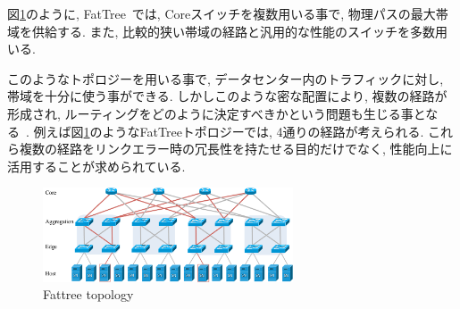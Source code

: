 \documentclass[10pt, a4paper, twocolumn]{jsarticle}
\begin{document}
図\ref{fig:fattree}のように, FatTree~\cite{fattree}では, Coreスイッチを複数用いる事で,
物理パスの最大帯域を供給する.
また, 比較的狭い帯域の経路と汎用的な性能のスイッチを多数用いる.

このようなトポロジーを用いる事で, データセンター内のトラフィックに対し, 帯域を十分に使う事ができる.
しかしこのような密な配置により, 複数の経路が形成され, ルーティングをどのように決定すべきかという問題も生じる事となる~\cite{improving}.
例えば図\ref{fig:fattree}のようなFatTreeトポロジーでは, 4通りの経路が考えられる.
これら複数の経路をリンクエラー時の冗長性を持たせる目的だけでなく, 性能向上に活用することが求められている.
\begin{figure}[h]
    \begin{center}
    \includegraphics[autoebb, width=210pt]{./img/fattree_topology.pdf}
    \caption{Fattree topology}
    \label{fig:fattree}
    \end{center}
\end{figure}

\end{document}
